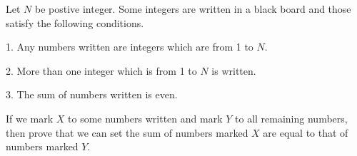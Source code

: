 Let $ N$ be postive integer. Some integers are written in a black board and those satisfy the following conditions.

1. Any numbers written are integers which are from 1 to $ N$.

2. More than one integer which is from 1 to $ N$ is written.

3. The sum of numbers written is even.

If we mark $ X$ to some numbers written and mark $ Y$  to all remaining numbers, then prove that we can set the sum of numbers marked $ X$ are equal to that of numbers marked $ Y$.